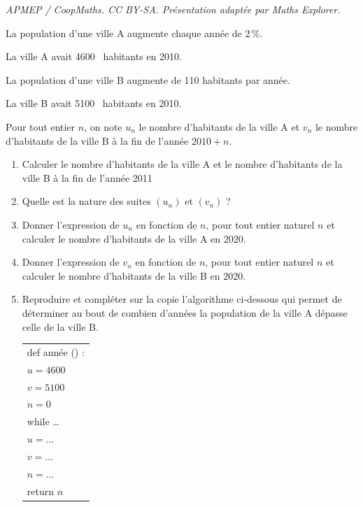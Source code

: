 \documentclass[10pt]{article}
\providecommand{\np}[2][]{{#2~#1}}
\begin{document}
\noindent\textit{APMEP / CoopMaths. CC BY-SA. Présentation adaptée par Maths Explorer.}\par\medskip
\medskip

La population d'une ville A augmente chaque année de 2\,\%. 

La ville A avait \np{4600} habitants en 2010.

La population d'une ville B augmente de 110 habitants par année.

La ville B avait \np{5100} habitants en 2010.

Pour tout entier $n$, on note $u_n$ le nombre d'habitants de la ville A et $v_n$ le nombre d'habitants de la ville B à la fin de l'année $2010 + n$.

\medskip

\begin{enumerate}
\item Calculer le nombre d'habitants de la ville A et le nombre d'habitants de la ville B à la fin de l'année 2011
\item Quelle est la nature des suites $\left(u_n\right)$ et $\left(v_n\right)$ ?
\item Donner l'expression de $u_n$ en fonction de $n$, pour tout entier naturel $n$ et calculer le nombre d'habitants de la ville A en 2020.
\item Donner l'expression de $v_n$ en fonction de $n$, pour tout entier naturel $n$ et calculer le nombre d'habitants de la ville B en 2020.
\item Reproduire et compléter sur la copie l'algorithme ci-dessous qui permet de déterminer au bout de combien d'années la population de la ville A dépasse celle de la ville B.

\begin{center}
\renewcommand{\arraystretch}{1.2}
\begin{tabular}{|l|}\hline
def année () : \hspace*{3cm}\\
\quad $u =\np{4600}$\\
\quad $v =\np{5100}$\\
\quad $n = 0$\\
\quad while \ldots\\
\qquad $u = \ldots$\\
\qquad $v = \ldots$\\
\qquad $n = \ldots$\\
\quad return $n$\\ \hline
\end{tabular}
\end{center}
\end{enumerate}

\bigskip
\end{document}
